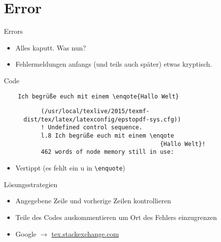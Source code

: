 \section{Error}
\begin{frame}[fragile]{Errors}
  \begin{itemize}
    \item Alles kaputt. Was nun?
    \item Fehlermeldungen anfangs (und teils auch später) etwas kryptisch.
  \end{itemize}
  \begin{block}{Code}
    \begin{lstlisting}
    Ich begrüße euch mit einem \enqote{Hallo Welt}
    \end{lstlisting}
  \end{block}
  \begin{figure}
  \centering
  \begin{lstlisting}
     (/usr/local/texlive/2015/texmf-dist/tex/latex/latexconfig/epstopdf-sys.cfg))
     ! Undefined control sequence.
     l.8 Ich begrüße euch mit einem \enqote
                                       {Hallo Welt}!
     462 words of node memory still in use:
  \end{lstlisting}
  \end{figure}
  \huge
  \begin{itemize}
    \item<2->[$\Rightarrow$] Vertippt (es fehlt ein u in \lstinline+\enquote+)
  \end{itemize}
\end{frame}

\begin{frame}{Lösungsstrategien}
  \Large
  \begin{itemize}
    \item Angegebene Zeile und vorherige Zeilen kontrollieren
    \item Teile des Codes auskommentieren um Ort des Fehlers einzugrenzen
    \item Google $\rightarrow$ \href{http://tex.stackexchange.com}{tex.stackexchange.com}
  \end{itemize}
\end{frame}
